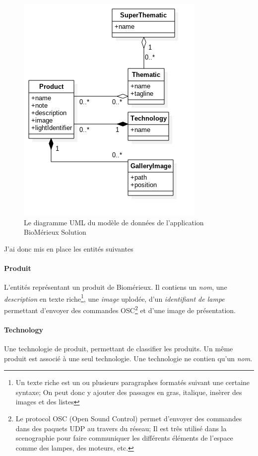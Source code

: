 \begin{figure}[h]
    \centering
    \includegraphics[scale=0.6]{img/uml-bmx-solution.png}
    \caption{Le diagramme UML du modèle de données de l'application BioMérieux Solution}
\end{figure}

\clearpage

J'ai donc mis en place les entités suivantes

\paragraph{Produit} L'entités représentant un produit de Biomérieux.
Il contiens un \emph{nom}, une \emph{description} en texte riche\footnote{Un texte riche est un ou plusieurs paragraphes formatés suivant une certaine syntaxe; On peut donc y ajouter des passages en gras, italique, insèrer des images et des listes}, une \emph{image} uplodée, d'un \emph{identifiant de lampe} permettant d'envoyer des commandes OSC\footnote{Le protocol OSC (Open Sound Control) permet d'envoyer des commandes dans des paquets UDP au travers du réseau; Il est três utilisé dans la scenographie pour faire communiquer les différents éléments de l'espace comme des lampes, des moteurs, etc.} et d'une image de présentation.

\paragraph{Technology} Une technologie de produit, permettant de classifier les produits.
Un même produit est associé à une seul technologie.
Une technologie ne contien qu'un \emph{nom}.

